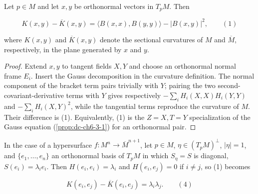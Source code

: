 \begin{theorem}[Gauss]
  \label{thm:dc-ch6-2-5}
  \leanok
  Let $p\in M$ and let $x,y$ be orthonormal vectors in $T_pM$. Then

  $$
  K(x,y)-\overline{K}(x,y)=\langle B(x,x),B(y,y)\rangle-|B(x,y)|^2,\qquad(1)
  $$

  where $K(x,y)$ and $\overline{K}(x,y)$ denote the sectional curvatures of $M$ and
  $\overline{M}$, respectively, in the plane generated by $x$ and $y$.
\end{theorem}
\begin{proof}
  \leanok
  \sketch
  Extend $x,y$ to tangent fields $X,Y$ and choose an orthonormal normal frame
  $E_i$. Insert the Gauss decomposition in the curvature definition. The normal
  component of the bracket term pairs trivially with $Y$; pairing the two
  second-covariant-derivative terms with $Y$ gives respectively
  $-\sum_iH_i(X,X)H_i(Y,Y)$ and $-\sum_iH_i(X,Y)^2$, while the tangential
  terms reproduce the curvature of $M$. Their difference is (1). Equivalently,
  (1) is the $Z=X,T=Y$ specialization of the Gauss equation
  (\cref{prop:dc-ch6-3-1}) for an orthonormal pair.
\end{proof}

\begin{remark}
  \label{rem:dc-ch6-2-6}
  \leanok
  In the case of a hypersurface $f:M^n\to\overline{M}^{n+1}$, let $p\in M$,
  $\eta\in(T_pM)^\perp$, $|\eta|=1$, and $\{e_1,\dots,e_n\}$ an orthonormal basis of $T_pM$ in
  which $S_\eta=S$ is diagonal, $S(e_i)=\lambda_ie_i$. Then $H(e_i,e_i)=\lambda_i$
  and $H(e_i,e_j)=0$ if $i\neq j$, so (1) becomes
  
  $$
  K(e_i,e_j)-\overline{K}(e_i,e_j)=\lambda_i\lambda_j.\qquad(4)
  $$
\end{remark}

